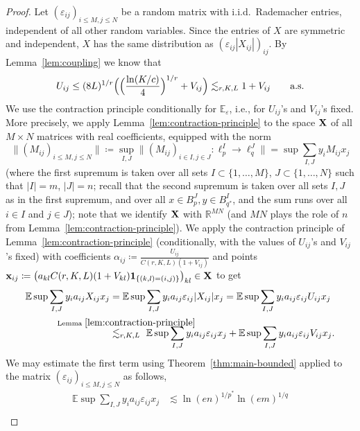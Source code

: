 \documentclass[a4paper]{amsart}
\theoremstyle{definition}
\theoremstyle{remark}
\numberwithin{equation}{section}
\newcommand*{\RR}{\mathbb{R}}
\newcommand*{\EE}{\mathbb{E}}
\newcommand*{\ind}{\mathbf{1}} %
\begin{document}
\begin{proof}
	Let $(\varepsilon_{ij})_{i\leq M, j\leq N}$ be a random matrix with i.i.d.\ Rademacher entries, independent of all other random variables. Since the entries of $X$ are symmetric and independent, $X$ has the same distribution as $(\varepsilon_{ij}|X_{ij}|)_{ij}$.
	 By Lemma~\ref{lem:coupling} we know that
	\begin{equation*}
		U_{ij}\le  (8L)^{1/r}\Bigl(\Bigl(\frac{\ln(K/c)}4\Bigr)^{1/r} +V_{ij} \Bigr) \lesssim_{r,K,L} 1+V_{ij} \qquad \text{a.s.}
	\end{equation*}
	We use the contraction principle conditionally for $\EE_{\varepsilon}$, i.e., for $U_{ij}$'s and $V_{ij}$'s fixed. 
	More precisely, we apply Lemma~\ref{lem:contraction-principle} to the space $\bf{X}$ of all $M\times N$ matrices with real coefficients, equipped with the norm 
	\[
	\|(M_{ij})_{i\leq M,j\leq N}\|\coloneqq \sup_{I,J} \bigl\|(M_{ij})_{i\in I,j\in J}\colon \ell_p^I \to \ell_q^J \bigr\| = \sup \sum_{I,J} y_iM_{ij}x_j
	\]
	 (where the first supremum is taken over all sets $I\subset \{1,\ldots,M\}$, $J\subset \{1,\ldots,N\}$ such that $|I|=m$, $|J|=n$; recall that the second supremum is taken over all sets $I,J$ as in the first supremum, and  over all $x\in B_p^ {J}, y\in B_{q^*}^ {I}$, and the  sum  runs over all $i\in I$ and $j\in J$);
	 note that we identify $\bf{X}$ with $\RR^{MN}$ (and $MN$ plays the role of $n$ from Lemma~\ref{lem:contraction-principle}).
	  We apply the contraction principle of Lemma~\ref{lem:contraction-principle} 
	  (conditionally, with the values of $U_{ij}$'s and $V_{ij}$'s fixed)
	  with coefficients $\alpha_{ij}\coloneqq \frac{U_{ij}}{C(r,K,L)(1+V_{ij})}$ and  points ${\bf x}_{ij} \coloneqq \bigl(a_{kl}C(r,K,L)(1+V_{kl})\ind_{\{(k,l)=(i,j)\}}\bigr)_{kl} \in \bf{X}$ to get
	\begin{align} \label{proof_cor_psi_r1}
	\nonumber
		\EE \sup \sum_{I,J} y_ia_{ij} X_{ij} x_j
		& =  \EE \sup \sum_{I,J} y_ia_{ij} \varepsilon_{ij}|X_{ij}|x_j =  \EE \sup \sum_{I,J} y_ia_{ij} \varepsilon_{ij}U_{ij}x_j 
		\\
		& \overset{\mathclap{\text{Lemma } \ref{lem:contraction-principle}}} {\lesssim_{r,K,L}} \  \EE\sup \sum_{I,J} y_ia_{ij} \varepsilon_{ij}x_j  +  \EE\sup \sum_{I,J} y_i a_{ij} \varepsilon_{ij}V_{ij}x_j  .
	\end{align}
	We may estimate the first term using Theorem~\ref{thm:main-bounded} applied to the matrix $(\varepsilon_{ij})_{i\leq M, j\leq N}$ as follows,
	\begin{align}
		\EE\sup \sum_{I,J} y_ia_{ij} \varepsilon_{ij}x_j
 		&\lesssim  \ln(en)^{1/p^*}  \ln(em)^{1/q}\nonumber\\

\end{align}
\end{proof}
\end{document}
